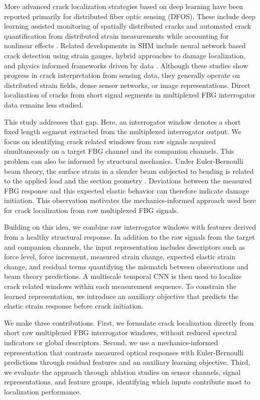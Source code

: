 \documentclass[fleqn,10pt]{wlscirep}
\begin{document}
More advanced crack localization strategies based on deep learning have been reported primarily for distributed fiber optic sensing (DFOS). These include deep learning assisted monitoring of spatially distributed cracks and automated crack quantification from distributed strain measurements while accounting for nonlinear effects \cite{liu2023,lu2025}. Related developments in SHM include neural network based crack detection using strain gauges, hybrid approaches to damage localization, and physics informed frameworks driven by data \cite{yoon2022,moreh2025,si2025}. Although these studies show progress in crack interpretation from sensing data, they generally operate on distributed strain fields, dense sensor networks, or image representations. Direct localization of cracks from short signal segments in multiplexed FBG interrogator data remains less studied.

This study addresses that gap. Here, an interrogator window denotes a short fixed length segment extracted from the multiplexed interrogator output. We focus on identifying crack related windows from raw signals acquired simultaneously on a target FBG channel and its companion channels. This problem can also be informed by structural mechanics. Under Euler-Bernoulli beam theory, the surface strain in a slender beam subjected to bending is related to the applied load and the section geometry \cite{ochsner2021}. Deviations between the measured FBG response and this expected elastic behavior can therefore indicate damage initiation. This observation motivates the mechanics-informed approach used here for crack localization from raw multiplexed FBG signals.

Building on this idea, we combine raw interrogator windows with features derived from a healthy structural response. In addition to the raw signals from the target and companion channels, the input representation includes descriptors such as force level, force increment, measured strain change, expected elastic strain change, and residual terms quantifying the mismatch between observations and beam theory predictions. A multiscale temporal CNN is then used to localize crack related windows within each measurement sequence. To constrain the learned representation, we introduce an auxiliary objective that predicts the elastic strain response before crack initiation.

We make three contributions. First, we formulate crack localization directly from short raw multiplexed FBG interrogator windows, without reduced spectral indicators or global descriptors. Second, we use a mechanics-informed representation that contrasts measured optical responses with Euler-Bernoulli predictions through residual features and an auxiliary learning objective. Third, we evaluate the approach through ablation studies on sensor channels, signal representations, and feature groups, identifying which inputs contribute most to localization performance.
\end{document}
